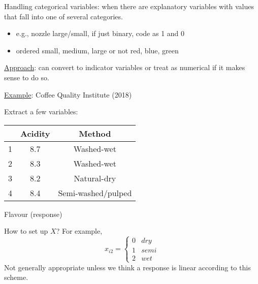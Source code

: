 Handling categorical variables: when there are explanatory
variables with values that fall into one of
several categories.
\begin{itemize}
  \item e.g., nozzle large/small, if just binary,
        code as 1 and 0
  \item ordered small, medium, large or not
        red, blue, green
\end{itemize}
\underline{Approach}: can convert to indicator variables
or treat as numerical if it makes sense to do so.

\underline{Example}: Coffee Quality Institute (2018)

Extract a few variables:
\begin{table}[H]
  \centering
  \begin{NiceTabular}{|c|c|c|}
    \toprule
    & Acidity & Method             \\
     & 8.7     & Washed-wet         \\
    2 & 8.3     & Washed-wet         \\
    3 & 8.2     & Natural-dry        \\
    4 & 8.4     & Semi-washed/pulped\\
    \bottomrule
  \end{NiceTabular}
\end{table}
Flavour (response)

How to set up $ X $? For example,
\[ x_{i2}=\begin{cases*}
    0 & dry  \\
    1 & semi \\
    2 & wet
  \end{cases*} \]
Not generally appropriate unless we think
a response is linear according to this scheme.

